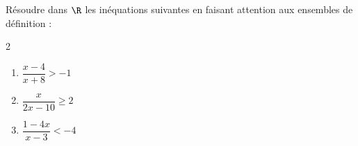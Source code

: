 \begin{exo}{}
	Résoudre dans $\R$ les inéquations suivantes en faisant attention aux ensembles de définition :
	\vspace*{-2mm}\begin{multicols}{2}
	\begin{enumerate}[itemsep=2mm]
		\item $\dfrac{x - 4}{x + 8} > -1$
		\item $\dfrac{x}{2x - 10} \ge 2$
		\item $\dfrac{1 - 4x}{x - 3} < -4$
	\end{enumerate}
	\end{multicols}\vspace*{-2mm}
\end{exo}
